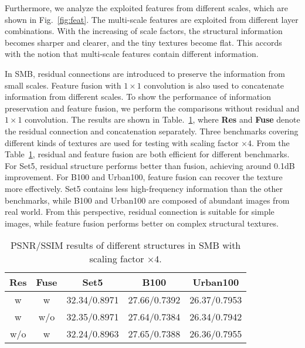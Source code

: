 \documentclass[manuscript,screen]{acmart}
\begin{document}
Furthermore, we analyze the exploited features from different scales, which are shown in Fig.~\ref{fig:feat}. The multi-scale features are exploited from different layer combinations. With the increasing of scale factors, the structural information becomes sharper and clearer, and the tiny textures become flat. This accords with the notion that multi-scale features contain different information.

In SMB, residual connections are introduced to preserve the information from small scales. Feature fusion with $1\times1$ convolution is also used to concatenate information from different scales. To show the performance of information preservation and feature fusion, we perform the comparisons without residual and $1\times1$ convolution. The results are shown in Table.~\ref{tab:abl_pmrb}, where \textbf{Res} and \textbf{Fuse} denote the residual connection and concatenation separately. Three benchmarks covering different kinds of textures are used for testing with scaling factor $\times4$.
From the Table~\ref{tab:abl_pmrb}, residual and feature fusion are both efficient for different benchmarks. For Set5, residual structure performs better than fusion, achieving around 0.1dB improvement. For B100 and Urban100, feature fusion can recover the texture more effectively. Set5 contains less high-frequency information than the other benchmarks, while B100 and Urban100 are composed of abundant images from real world. From this perspective, residual connection is suitable for simple images, while feature fusion performs better on complex structural textures.

\begin{table}[t]
	\centering
	\caption{PSNR/SSIM results of different structures in SMB with scaling factor $\times4$.}
	\label{tab:abl_pmrb}
\begin{tabular}{|c|c|c|c|c|}
		\hline  
		\textbf{Res}& \textbf{Fuse}& \textbf{Set5}& \textbf{B100} &\textbf{Urban100} \\
		\hline
		\hline
		w&w& 32.34/0.8971& 27.66/0.7392& 26.37/0.7953\\ 
		w&w/o& 32.35/0.8971& 27.64/0.7384& 26.34/0.7942\\
		w/o&w& 32.24/0.8963& 27.65/0.7388& 26.36/0.7955\\
		\hline
	\end{tabular}
\end{table}
\end{document}
